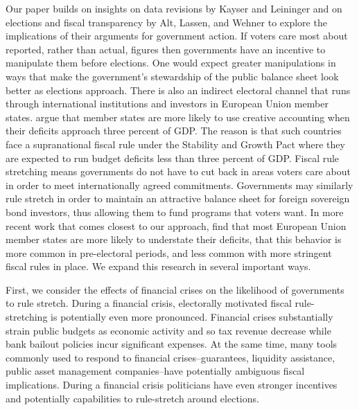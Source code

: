 \documentclass[]{article}
\begin{document}
Our paper builds on insights on data revisions by Kayser and Leininger and on elections and fiscal transparency by Alt, Lassen, and Wehner to explore the implications of their arguments for government action.  If voters care most about reported, rather than actual, figures then governments have an incentive to manipulate them before elections. One would expect greater manipulations in ways that make the government's stewardship of the public balance sheet look better as elections approach. There is also an indirect electoral channel that runs through international institutions and investors in European Union member states. \cite{vonHagenWolff2006} argue that member states are more likely to use creative accounting when their deficits approach three percent of GDP. The reason is that such countries face a supranational fiscal rule under the Stability and Growth Pact where they are expected to run budget deficits less than three percent of GDP. Fiscal rule stretching means governments do not have to cut back in areas voters care about in order to meet internationally agreed commitments. Governments may similarly rule stretch in order to maintain an attractive balance sheet for foreign sovereign bond investors, thus allowing them to fund programs that voters want. In more recent work that comes closest to our approach, \cite{DeCastro2013} find that most European Union member states are more likely to understate their deficits, that this behavior is more common in pre-electoral periods, and less common with more stringent fiscal rules in place. We expand this research in several important ways.

First, we consider the effects of financial crises on the likelihood of governments to rule stretch. During a financial crisis, electorally motivated fiscal rule-stretching is potentially even more pronounced. Financial crises substantially strain public budgets as economic activity and so tax revenue decrease while bank bailout policies incur significant expenses. At the same time, many tools commonly used to respond to financial crises--guarantees, liquidity assistance, public asset management companies--have potentially ambiguous fiscal implications. During a financial crisis politicians have even stronger incentives and potentially capabilities to rule-stretch around elections.
\end{document}
